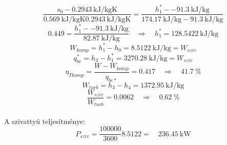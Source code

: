 \begin{equation*}
    \dfrac{s_0-\SI{0.2943}{\kilo\joule\per\kilogram\kelvin}}{\SI{0.569}{\kilo\joule\per\kilogram\kelvin}\SI{0.2943}{\kilo\joule\per\kilogram\kelvin}}
    =
    \dfrac{h^*_1-\SI{-91.3}{\kilo\joule\per\kilogram}}{\SI{174.17}{\kilo\joule\per\kilogram}-\SI{91.3}{\kilo\joule\per\kilogram}}
\end{equation*}
   \begin{equation*}
	0.449=\dfrac{h^*_1-\SI{-91.3}{\kilo\joule\per\kilogram}}{\SI{82.87}{\kilo\joule\per\kilogram}}
	\quad
	\Rightarrow
	\quad
	h^*_1=\SI{128.5422}{\kilo\joule\per\kilogram}
\end{equation*}
  \begin{equation*}
	W_{komp}=h^*_1-h_0=\SI{8.5122}{\kilo\joule\per\kilogram}=W_{sziv}
\end{equation*}
 \begin{equation*}
q^*_{be}=h_3-h^*_1=\SI{3270.28}{\kilo\joule\per\kilogram}=W_{sziv}
\end{equation*}
 \begin{equation*}
	\eta_{Tkomp}=\dfrac{W-W_{komp}}{q_{be*}}=\SI{0.417}
	\quad
	\Rightarrow
	\quad
	\SI{41.7}{\%}
\end{equation*}
 \begin{equation*}
	W_{turb}=h_3-h_4=\SI{1372.95}{\kilo\joule\per\kilogram}
\end{equation*}
\begin{equation*}
	\dfrac{W_{sziv}}{W_{turb}}=\SI{0.0062}
	\quad
	\Rightarrow
	\quad
	\SI{0.62}{\%}
\end{equation*}
\\A szivattyú teljesítménye:
\begin{equation*}
    P_{sziv}=\dfrac{100000}{3600}\SI {8.5122}=
    \quad
    \SI{236.45}{\kilo\watt}
\end{equation*}
\\

